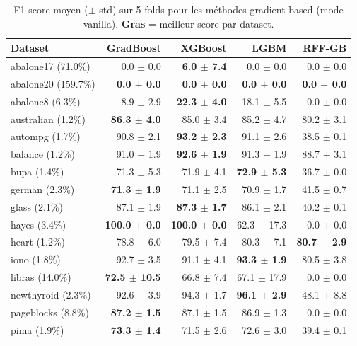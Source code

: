 \begin{table}[ht]
\centering
\small
\caption{F1-score moyen ($\pm$ std) sur 5 folds pour les méthodes gradient-based (mode vanilla). \textbf{Gras} = meilleur score par dataset.}
\label{tab:gradient_methods}
\begin{tabular}{lrrrr}
\toprule
\textbf{Dataset} & \textbf{GradBoost} & \textbf{XGBoost} & \textbf{LGBM} & \textbf{RFF-GB} \\
\midrule
  abalone17 (71.0\%) & 0.0 $\pm$ 0.0 & \textbf{6.0 $\pm$ 7.4} & 0.0 $\pm$ 0.0 & 0.0 $\pm$ 0.0 \\
  abalone20 (159.7\%) & \textbf{0.0 $\pm$ 0.0} & \textbf{0.0 $\pm$ 0.0} & \textbf{0.0 $\pm$ 0.0} & \textbf{0.0 $\pm$ 0.0} \\
  abalone8 (6.3\%) & 8.9 $\pm$ 2.9 & \textbf{22.3 $\pm$ 4.0} & 18.1 $\pm$ 5.5 & 0.0 $\pm$ 0.0 \\
  australian (1.2\%) & \textbf{86.3 $\pm$ 4.0} & 85.0 $\pm$ 3.4 & 85.2 $\pm$ 4.7 & 80.2 $\pm$ 3.1 \\
  autompg (1.7\%) & 90.8 $\pm$ 2.1 & \textbf{93.2 $\pm$ 2.3} & 91.1 $\pm$ 2.6 & 38.5 $\pm$ 0.1 \\
  balance (1.2\%) & 91.0 $\pm$ 1.9 & \textbf{92.6 $\pm$ 1.9} & 91.3 $\pm$ 1.9 & 88.7 $\pm$ 3.1 \\
  bupa (1.4\%) & 71.3 $\pm$ 5.3 & 71.9 $\pm$ 4.1 & \textbf{72.9 $\pm$ 5.3} & 36.7 $\pm$ 0.0 \\
  german (2.3\%) & \textbf{71.3 $\pm$ 1.9} & 71.1 $\pm$ 2.5 & 70.9 $\pm$ 1.7 & 41.5 $\pm$ 0.7 \\
  glass (2.1\%) & 87.1 $\pm$ 1.9 & \textbf{87.3 $\pm$ 1.7} & 86.1 $\pm$ 2.1 & 40.2 $\pm$ 0.1 \\
  hayes (3.4\%) & \textbf{100.0 $\pm$ 0.0} & \textbf{100.0 $\pm$ 0.0} & 62.3 $\pm$ 17.3 & 0.0 $\pm$ 0.0 \\
  heart (1.2\%) & 78.8 $\pm$ 6.0 & 79.5 $\pm$ 7.4 & 80.3 $\pm$ 7.1 & \textbf{80.7 $\pm$ 2.9} \\
  iono (1.8\%) & 92.7 $\pm$ 3.5 & 91.1 $\pm$ 4.1 & \textbf{93.3 $\pm$ 1.9} & 80.5 $\pm$ 3.8 \\
  libras (14.0\%) & \textbf{72.5 $\pm$ 10.5} & 66.8 $\pm$ 7.4 & 67.1 $\pm$ 17.9 & 0.0 $\pm$ 0.0 \\
  newthyroid (2.3\%) & 92.6 $\pm$ 3.9 & 94.3 $\pm$ 1.7 & \textbf{96.1 $\pm$ 2.9} & 48.1 $\pm$ 8.8 \\
  pageblocks (8.8\%) & \textbf{87.2 $\pm$ 1.5} & 87.1 $\pm$ 1.5 & 86.9 $\pm$ 1.3 & 0.0 $\pm$ 0.0 \\
  pima (1.9\%) & \textbf{73.3 $\pm$ 1.4} & 71.5 $\pm$ 2.6 & 72.6 $\pm$ 3.0 & 39.4 $\pm$ 0.1 \\

\end{tabular}
\end{table}
